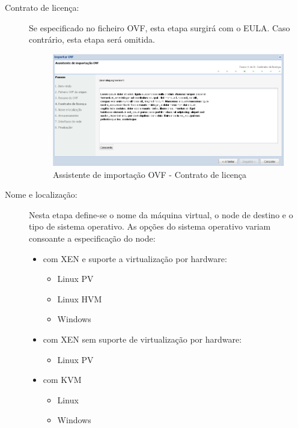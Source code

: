 \begin{description}
    \item[Contrato de licença:] Se especificado no ficheiro OVF, esta etapa surgirá com o EULA. Caso contrário, esta etapa será omitida.
		\begin{figure}[H]
            \begin{center}
            \includegraphics[scale=0.5]{screenshots/ovf_import_eula.png}
            \caption{Assistente de importação OVF - Contrato de licença}
            \label{fig:ovf_import_eula}
            \end{center}
        \end{figure}

    \item[Nome e localização:] Nesta etapa define-se o nome da máquina virtual, o node de destino e o tipo de sistema operativo. As opções do sistema operativo variam consoante a especificação do node:
		\begin{itemize}
			\item com XEN e suporte a virtualização por hardware:
			\begin{itemize}
				\item Linux PV
				\item Linux HVM
				\item Windows
			\end{itemize}
 			\item com XEN sem suporte de virtualização por hardware:
			\begin{itemize}
				\item Linux PV
			\end{itemize}
 			\item com KVM
			\begin{itemize}
				\item Linux
				\item Windows
			\end{itemize}
		\end{itemize}


\end{description}
